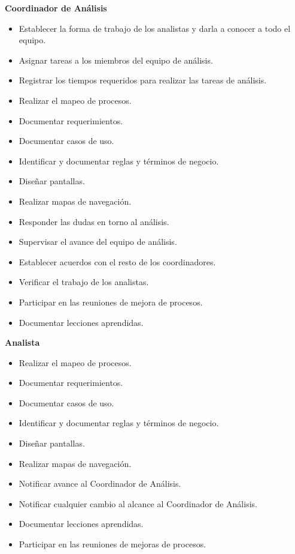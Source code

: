 \textbf{Coordinador de Análisis}
\begin{itemize}
 \item Establecer la forma de trabajo de los analistas y darla a conocer a todo el equipo.
 \item Asignar tareas a los miembros del equipo de análisis.
 \item Registrar los tiempos requeridos para realizar las tareas de análisis.
 \item Realizar el mapeo de procesos.
 \item Documentar requerimientos.
 \item Documentar casos de uso.
 \item Identificar y documentar reglas y términos de negocio.
 \item Diseñar pantallas.
 \item Realizar mapas de navegación.
 \item Responder las dudas en torno al análisis.
 \item Supervisar el avance del equipo de análisis.
 \item Establecer acuerdos con el resto de los coordinadores.
 \item Verificar el trabajo de los analistas.
 \item Participar en las reuniones de mejora de procesos.
 \item Documentar lecciones aprendidas.\\
\end{itemize}
\newpage 
\textbf{Analista}
\begin{itemize}
 \item Realizar el mapeo de procesos.
 \item Documentar requerimientos.
 \item Documentar casos de uso.
 \item Identificar y documentar reglas y términos de negocio.
 \item Diseñar pantallas.
 \item Realizar mapas de navegación.
 \item Notificar avance al Coordinador de Análisis.
 \item Notificar cualquier cambio al alcance al Coordinador de Análisis.
 \item Documentar lecciones aprendidas.
 \item Participar en las reuniones de mejoras de procesos.\\
\end{itemize}

